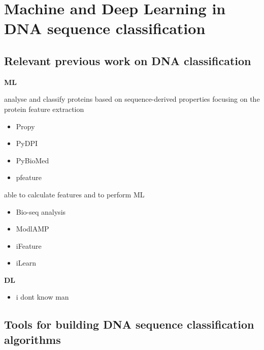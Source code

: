 \chapter{Machine and Deep Learning in DNA sequence classification} \label{sec:ml_dl_dna}

\section{Relevant previous work on DNA classification}

\textbf{ML}

analyse and classify proteins based on sequence-derived properties focusing on the protein feature extraction
\begin{itemize}
    \item Propy
    \item PyDPI
    \item PyBioMed
    \item pfeature
\end{itemize}

able to calculate features and to perform ML
\begin{itemize}
    \item Bio-seq analysis
    \item ModlAMP
    \item iFeature
    \item iLearn
\end{itemize}

\textbf{DL}

\begin{itemize}
    \item i dont know man 
\end{itemize}


\section{Tools for building DNA sequence classification algorithms}

